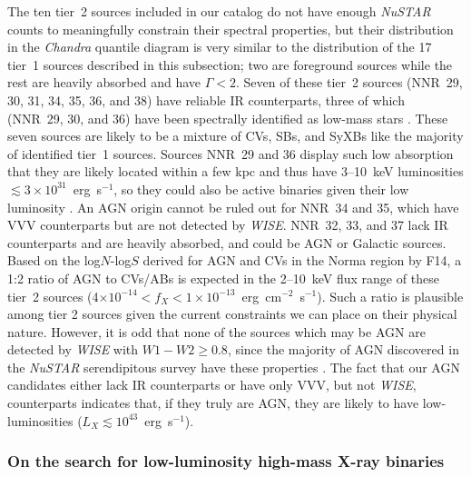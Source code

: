 \documentclass[iop,revtex4]{emulateapj}
\begin{document}
The ten tier~2 sources included in our catalog do not have enough \textit{NuSTAR} counts to meaningfully constrain their spectral properties, but their distribution in the \textit{Chandra} quantile diagram is very similar to the distribution of the 17 tier~1 sources described in this subsection; two are foreground sources while the rest are heavily absorbed and have $\Gamma<2$.  Seven of these tier~2 sources (NNR~29, 30, 31, 34, 35, 36, and 38) have reliable IR counterparts, three of which (NNR~29, 30, and 36) have been spectrally identified as low-mass stars \citep{rahoui14}.  These seven sources are likely to be a mixture of CVs, SBs, and SyXBs like the majority of identified tier~1 sources.  Sources NNR~29 and 36 display such low absorption that they are likely located within a few kpc and thus have 3--10~keV luminosities $\lesssim3\times10^{31}$~erg~s$^{-1}$, so they could also be active binaries given their low luminosity \citep{strassmeier93}.  An AGN origin cannot be ruled out for NNR~34 and 35, which have VVV counterparts but are not detected by \textit{WISE}.  NNR~32, 33, and 37 lack IR counterparts and are heavily absorbed, and could be AGN or Galactic sources.  Based on the log$N$-log$S$ derived for AGN and CVs in the Norma region by F14, a 1:2 ratio of AGN to CVs/ABs is expected in the 2--10~keV flux range of these tier~2 sources (4$\times10^{-14} < f_X <1\times10^{-13}$~erg~cm$^{-2}$~s$^{-1}$).  Such a ratio is plausible among tier 2 sources given the current constraints we can place on their physical nature.  However, it is odd that none of the sources which may be AGN are detected by \textit{WISE} with $W1-W2\geq0.8$, since the majority of AGN discovered in the \textit{NuSTAR} serendipitous survey have these properties \citep{lansbury16}.  The fact that our AGN candidates either lack IR counterparts or have only VVV, but not \textit{WISE}, counterparts indicates that, if they truly are AGN, they are likely to have low-luminosities ($L_X\lesssim10^{43}$~erg~s$^{-1}$).  


\subsubsection{On the search for low-luminosity high-mass X-ray binaries}
\end{document}

